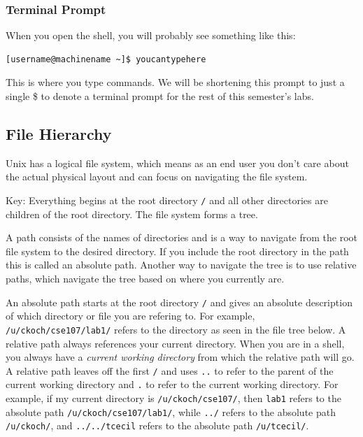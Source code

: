 \documentclass[11pt]{cselabheader}
\begin{document}
\subsubsection{Terminal Prompt}

When you open the shell, you will probably see something like this:

\begin{verbatim}
[username@machinename ~]$ youcantypehere
\end{verbatim}

This is where you type commands. We will be shortening this prompt to just a
single \$ to denote a terminal prompt for the rest of this semester's labs.

\subsection{File Hierarchy}

Unix has a logical file system, which means as an end user you don't care about
the actual physical layout and can focus on navigating the file system.

Key: Everything begins at the root directory
\texttt{/} and all other directories are children of the root directory. The
file system forms a tree.

A path consists of the names of directories and is a way to navigate from the
root file system to the desired directory. If you include the root directory in
the path this is called an absolute path. Another way to navigate the tree is to
use relative paths, which navigate the tree based on where you currently are.

An absolute path starts at the root directory \texttt{/} and gives an absolute
description of which directory or file you are refering to. For example,
\texttt{/u/ckoch/cse107/lab1/} refers to the directory as seen in the file tree
below. A relative path always references your current directory. When you are in
a shell, you always have a \textit{current working directory} from which the
relative path will go. A relative path leaves off the first \texttt{/} and uses
\texttt{..} to refer to the parent of the current working directory and
\texttt{.} to refer to the current working directory. For example, if my current
directory is \texttt{/u/ckoch/cse107/}, then \texttt{lab1} refers to the absolute
path \texttt{/u/ckoch/cse107/lab1/}, while \texttt{../} refers to the absolute
path \texttt{/u/ckoch/}, and \texttt{../../tcecil} refers to the absolute path
\texttt{/u/tcecil/}.
\end{document}
